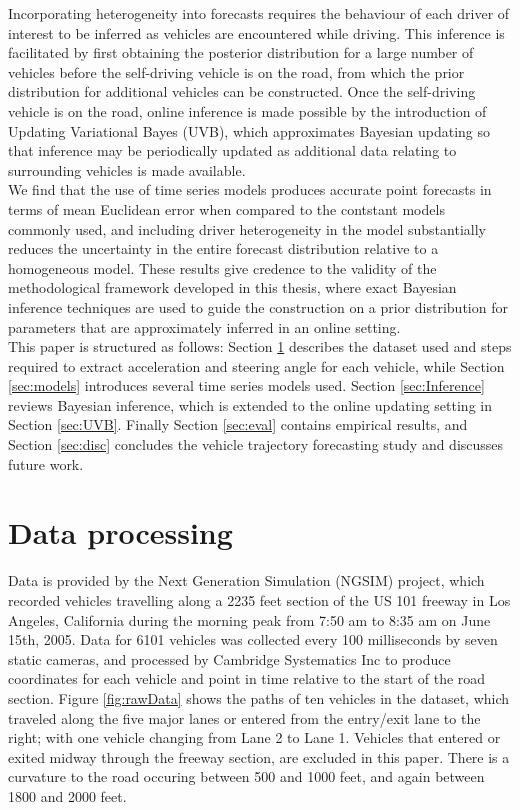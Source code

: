 \documentclass[12pt,a4paper]{article}\usepackage[]{graphicx}\usepackage[]{color}
\begin{document}
Incorporating heterogeneity into forecasts requires the behaviour of each driver of interest to be inferred as vehicles are encountered while driving. This inference is facilitated by first obtaining the posterior distribution for a large number of vehicles before the self-driving vehicle is on the road, from which the prior distribution for additional vehicles can be constructed. Once the self-driving vehicle is on the road, online inference is made possible by the introduction of Updating Variational Bayes (UVB), which approximates Bayesian updating so that inference may be periodically updated as additional data relating to surrounding vehicles is made available. 
\\

We find that the use of time series models produces accurate point forecasts in terms of mean Euclidean error when compared to the contstant models commonly used, and including driver heterogeneity in the model substantially reduces the uncertainty in the entire forecast distribution relative to a homogeneous model. These results give credence to the validity of the methodological framework developed in this thesis, where exact Bayesian inference techniques are used to guide the construction on a prior distribution for parameters that are approximately inferred in an online setting.
\\

This paper is structured as follows: Section \ref{sec:dataProcessing} describes the dataset used and steps required to extract acceleration and steering angle for each vehicle, while Section \ref{sec:models} introduces several time series models used. Section \ref{sec:Inference} reviews Bayesian inference, which is extended to the online updating setting in Section \ref{sec:UVB}. Finally Section \ref{sec:eval} contains empirical results, and Section \ref{sec:disc} concludes the vehicle trajectory forecasting study and discusses future work.

\section{Data processing}
\label{sec:dataProcessing}
Data is provided by the Next Generation Simulation (NGSIM) project, which recorded vehicles travelling along a 2235 feet section of the US 101 freeway in Los Angeles, California during the morning peak from 7:50 am to 8:35 am on June 15th, 2005. Data for 6101 vehicles was collected every 100 milliseconds by seven static cameras, and processed by Cambridge Systematics Inc to produce coordinates for each vehicle and point in time relative to the start of the road section. 
Figure \ref{fig:rawData} shows the paths of ten vehicles in the dataset, which traveled along the five major lanes or entered from the entry/exit lane to the right; with one vehicle changing from Lane 2 to Lane 1. Vehicles that entered or exited midway through the freeway section, are excluded in this paper. There is a curvature to the road occuring between 500 and 1000 feet, and again between 1800 and 2000 feet.
\\
\end{document}
